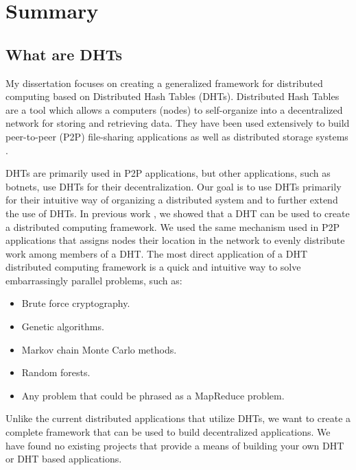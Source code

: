 \documentclass[12pt,a4paper]{article}
\begin{document}
\newpage





\section{Summary}
\subsection*{What are DHTs}
My dissertation focuses on creating a generalized framework for distributed computing based on Distributed Hash Tables (DHTs).
Distributed Hash Tables are a tool which allows a computers (nodes) to self-organize into a decentralized network for storing and retrieving data.
They have been used extensively to build peer-to-peer (P2P) file-sharing applications \cite{bittorrent} as well as distributed storage systems \cite{CFS}.

DHTs are primarily used in P2P applications, but other applications, such as botnets, use DHTs for their decentralization.
Our goal is to use DHTs primarily for their intuitive way of organizing a distributed system and to further extend the use of DHTs.
In previous work \cite{chordreduce}, we showed  that a DHT can be used to create a distributed computing framework.
We used the same mechanism used in P2P applications that assigns nodes their location in the network to evenly distribute work among members of a DHT.
The most direct application of a DHT distributed computing framework is a quick and intuitive way to solve embarrassingly parallel problems, such as:
\begin{itemize}
	\item Brute force cryptography.
	\item Genetic algorithms.
	\item Markov chain Monte Carlo methods.
	\item Random forests.
	\item Any problem that could be phrased as a MapReduce \cite{mapreduce} problem.
\end{itemize}
Unlike the current distributed applications that utilize DHTs, we want to create a complete framework that can be used to build decentralized applications.
We have found no existing projects that provide a means of building your own DHT or DHT based applications. %
\end{document}
